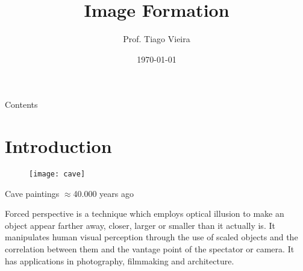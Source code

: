 


\title[Segmentation]{Image Formation} %

\author{Prof. Tiago Vieira} %
\date{\today} %





\begin{frame}
\titlepage %
\end{frame}

\begin{frame}{Contents}
\setcounter{tocdepth}{1}
\tableofcontents
\end{frame}


\section{Introduction}

\begin{frame}
\centering
\begin{figure}[!h]
\centering
\texttt{[image: cave]}
\end{figure}
Cave paintings $\approx$40.000 years ago
\end{frame}

\begin{frame}
\begin{block}{Forced perspective}
is a technique which employs optical illusion to make an object appear farther away, closer, larger or smaller than it actually is. It manipulates human visual perception through the use of scaled objects and the correlation between them and the vantage point of the spectator or camera. It has applications in photography, filmmaking and architecture.
\end{block}
\end{frame}

